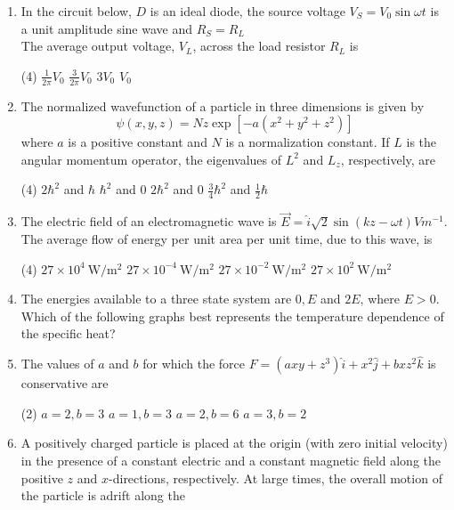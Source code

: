 \begin{enumerate}
\begin{tasks}
\end{tasks}
\item In the circuit below, $D$ is an ideal diode, the source voltage $V_{S}=V_{0} \sin \omega t$ is a unit amplitude sine wave and $R_{S}=R_{L}$	\\
The average output voltage, $V_{L}$, across the load resistor $R_{L}$ is
 \begin{tasks}(4)
	\task[\textbf{a.}] $\frac{1}{2 \pi} V_{0}$
	\task[\textbf{b.}] $\frac{3}{2 \pi} V_{0}$
	\task[\textbf{c.}]$3 V_{0}$
	\task[\textbf{d.}]$V_{0}$ 
\end{tasks}
\item The normalized wavefunction of a particle in three dimensions is given by
$$
\psi(x, y, z)=N z \exp \left[-a\left(x^{2}+y^{2}+z^{2}\right)\right]
$$
where $a$ is a positive constant and $N$ is a normalization constant. If $L$ is the angular momentum operator, the eigenvalues of $L^{2}$ and $L_{z}$, respectively, are
 \begin{tasks}(4)
	\task[\textbf{a.}]$2 \hbar^{2}$ and $\hbar$
	\task[\textbf{b.}]$\hbar^{2}$ and 0
	\task[\textbf{c.}] $2 \hbar^{2}$ and 0
	\task[\textbf{d.}] $\frac{3}{4} \hbar^{2}$ and $\frac{1}{2} \hbar$
\end{tasks}
\item The electric field of an electromagnetic wave is $\vec{E}=\hat{i} \sqrt{2} \sin (k z-\omega t) V m^{-1}$. The average flow of energy per unit area per unit time, due to this wave, is
 \begin{tasks}(4)
	\task[\textbf{a.}]$27 \times 10^{4} \mathrm{~W} / \mathrm{m}^{2}$
	\task[\textbf{b.}]$27 \times 10^{-4} \mathrm{~W} / \mathrm{m}^{2}$
	\task[\textbf{c.}]$27 \times 10^{-2} \mathrm{~W} / \mathrm{m}^{2}$
	\task[\textbf{d.}] $27 \times 10^{2} \mathrm{~W} / \mathrm{m}^{2}$
\end{tasks}
\item The energies available to a three state system are $0, E$ and $2 E$, where $E>0$. Which of the following graphs best represents the temperature dependence of the specific heat?	
\item The values of $a$ and $b$ for which the force $F=\left(a x y+z^{3}\right) \hat{i}+x^{2} \hat{j}+b x z^{2} \hat{k}$ is conservative are
 \begin{tasks}(2)
	\task[\textbf{a.}]$a=2, b=3$
	\task[\textbf{b.}]$a=1, b=3$
	\task[\textbf{c.}]$a=2, b=6$
	\task[\textbf{d.}]$a=3, b=2$
\end{tasks}
\item A positively charged particle is placed at the origin (with zero initial velocity) in the presence of a constant electric and a constant magnetic field along the positive $z$ and $x$-directions, respectively. At large times, the overall motion of the particle is adrift along the

\end{enumerate}
